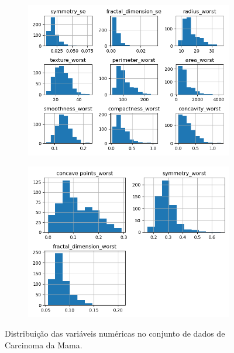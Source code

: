 \begin{figure}[H]
\begin{subfigure}[b]{0.3\textwidth}
\includegraphics[scale=0.3]{images/hist_cancer_t_3.png}
     \end{subfigure}
          \hfill
     \begin{subfigure}[b]{0.3\textwidth}
 \centering
\includegraphics[scale=0.3]{images/hist_cancer_t_4.png}
     \end{subfigure}
        \caption{Distribuição das variáveis numéricas no conjunto de dados de Carcinoma da Mama.}
         \label{fig:var:cancer:t}
\end{figure}

